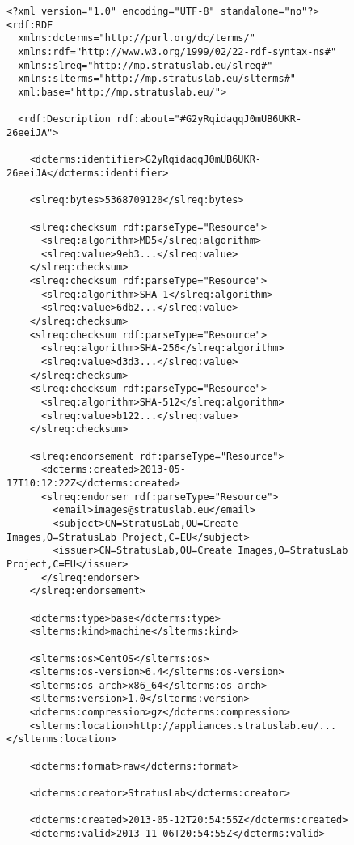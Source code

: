 \begin{figure}
\begin{center}
\tiny
\begin{verbatim}
<?xml version="1.0" encoding="UTF-8" standalone="no"?>
<rdf:RDF
  xmlns:dcterms="http://purl.org/dc/terms/"
  xmlns:rdf="http://www.w3.org/1999/02/22-rdf-syntax-ns#"
  xmlns:slreq="http://mp.stratuslab.eu/slreq#"
  xmlns:slterms="http://mp.stratuslab.eu/slterms#"
  xml:base="http://mp.stratuslab.eu/">
  
  <rdf:Description rdf:about="#G2yRqidaqqJ0mUB6UKR-26eeiJA">

    <dcterms:identifier>G2yRqidaqqJ0mUB6UKR-26eeiJA</dcterms:identifier>

    <slreq:bytes>5368709120</slreq:bytes>

    <slreq:checksum rdf:parseType="Resource">
      <slreq:algorithm>MD5</slreq:algorithm>
      <slreq:value>9eb3...</slreq:value>
    </slreq:checksum>
    <slreq:checksum rdf:parseType="Resource">
      <slreq:algorithm>SHA-1</slreq:algorithm>
      <slreq:value>6db2...</slreq:value>
    </slreq:checksum>
    <slreq:checksum rdf:parseType="Resource">
      <slreq:algorithm>SHA-256</slreq:algorithm>
      <slreq:value>d3d3...</slreq:value>
    </slreq:checksum>
    <slreq:checksum rdf:parseType="Resource">
      <slreq:algorithm>SHA-512</slreq:algorithm>
      <slreq:value>b122...</slreq:value>
    </slreq:checksum>
    
    <slreq:endorsement rdf:parseType="Resource">
      <dcterms:created>2013-05-17T10:12:22Z</dcterms:created>
      <slreq:endorser rdf:parseType="Resource">
        <email>images@stratuslab.eu</email>
        <subject>CN=StratusLab,OU=Create Images,O=StratusLab Project,C=EU</subject>
        <issuer>CN=StratusLab,OU=Create Images,O=StratusLab Project,C=EU</issuer>
      </slreq:endorser>
    </slreq:endorsement>

    <dcterms:type>base</dcterms:type>
    <slterms:kind>machine</slterms:kind>
    
    <slterms:os>CentOS</slterms:os>
    <slterms:os-version>6.4</slterms:os-version>
    <slterms:os-arch>x86_64</slterms:os-arch>
    <slterms:version>1.0</slterms:version>
    <dcterms:compression>gz</dcterms:compression>
    <slterms:location>http://appliances.stratuslab.eu/...</slterms:location>
    
    <dcterms:format>raw</dcterms:format>
    
    <dcterms:creator>StratusLab</dcterms:creator>
    
    <dcterms:created>2013-05-12T20:54:55Z</dcterms:created>
    <dcterms:valid>2013-11-06T20:54:55Z</dcterms:valid>
    

\end{verbatim}
\end{center}
\end{figure}
